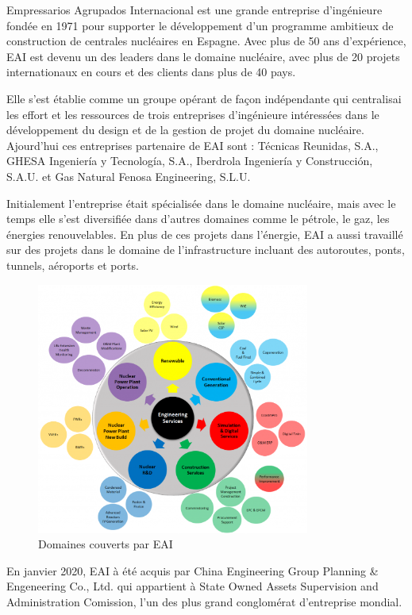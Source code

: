 \documentclass[11pt, openright]{book}
\begin{document}
Empressarios Agrupados Internacional est une grande entreprise d'ingénieure fondée en 1971  pour supporter le développement d'un programme ambitieux de construction de centrales nucléaires en Espagne. Avec plus de 50 ans d'expérience, EAI est devenu un des leaders dans le domaine nucléaire, avec plus de 20 projets internationaux en cours et des clients dans plus de 40 pays.

Elle s'est établie comme un groupe opérant de façon indépendante qui centralisai les effort et les ressources de trois entreprises d'ingénieure intéressées dans le développement du design et de la gestion de projet du domaine nucléaire. Ajourd'hui ces entreprises partenaire de EAI sont : Técnicas Reunidas, S.A., GHESA Ingeniería y Tecnología, S.A., Iberdrola Ingeniería y Construcción, S.A.U. et Gas Natural Fenosa Engineering, S.L.U.

Initialement l'entreprise était spécialisée dans le domaine nucléaire, mais avec le temps elle s'est diversifiée dans d'autres domaines comme le pétrole, le gaz, les énergies renouvelables. En plus de ces projets dans l'énergie, EAI a aussi travaillé sur des projets dans le domaine de l'infrastructure incluant des autoroutes, ponts, tunnels, aéroports et ports.

\begin{figure}[ht!]
    \centering
    \includegraphics[width=0.8\textwidth]{./object/EAI-proj.png}
    \caption{Domaines couverts par EAI}
\end{figure}

En janvier 2020, EAI à été acquis par China Engineering Group Planning \& Engeneering Co., Ltd. qui appartient à State Owned Assets Supervision and Administration Comission, l'un des plus grand conglomérat d'entreprise mondial.\cite{EAI1}
\end{document}
